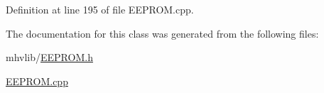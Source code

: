 Definition at line 195 of file E\-E\-P\-R\-O\-M.\-cpp.



The documentation for this class was generated from the following files\-:\begin{DoxyCompactItemize}
\item 
mhvlib/\hyperlink{_e_e_p_r_o_m_8h}{E\-E\-P\-R\-O\-M.\-h}\item 
\hyperlink{_e_e_p_r_o_m_8cpp}{E\-E\-P\-R\-O\-M.\-cpp}\end{DoxyCompactItemize}
